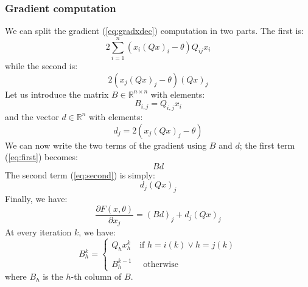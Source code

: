 \subsubsection{Gradient computation}
We can split the gradient (\ref{eq:gradxdec}) computation in two parts. The first is:
\begin{equation}\label{eq:first}
2 \sum_{i=1}^n \left(x_i (Q x)_i - \theta\right)Q_{ij}x_i
\end{equation}
while the second is:
\begin{equation}\label{eq:second}
2(x_j (Q x)_j - \theta)(Q x)_j
\end{equation}
Let us introduce the matrix $B \in \mathbb{R}^{n \times n}$ with elements:
\begin{equation}
B_{i,j} = Q_{i,j}  x_i 
\end{equation}
and the vector $d \in \mathbb{R}^n$ with elements:
\begin{equation}
d_j = 2 (x_j (Q x)_j - \theta) 
\end{equation}
We can now write the two terms of the gradient using $B$ and $d$; the first term (\ref{eq:first}) becomes:
\begin{equation}
B d
\end{equation}
The second term (\ref{eq:second}) is simply:
\begin{equation}
d_j (Q x)_j
\end{equation}
Finally, we have:
\begin{equation}\label{eq:newgradx}
\frac{\partial F(x,\theta)}{\partial x_j} =\left(B d\right)_j + d_j (Q x)_j
\end{equation}
At every iteration $k$, we have:
\begin{equation}
B^{k}_{h} = \begin{cases}
		  		Q_{h}x_h^{k} \quad \text{if } h = i(k) \vee h = j(k)\\\\
		  	    B^{k-1}_{h} \quad \text{     otherwise}
		  		\end{cases}
\end{equation}
where $B_{h}$ is the $h$-th column of $B$.